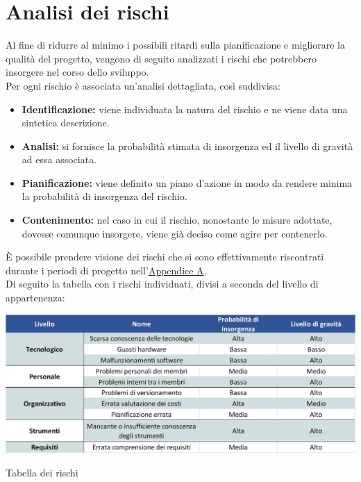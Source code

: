 \newpage

\section{Analisi dei rischi}

Al fine di ridurre al minimo i possibili ritardi sulla pianificazione e migliorare la qualità del progetto, vengono di seguito analizzati i rischi che potrebbero insorgere nel corso dello sviluppo.\\
Per ogni rischio è associata un'analisi dettagliata, così suddivisa:

\begin{itemize}
	\item \textbf{Identificazione:} viene individuata la natura del rischio e ne viene data una sintetica descrizione.
	\item \textbf{Analisi:} si fornisce la probabilità stimata di insorgenza ed il livello di gravità ad essa associata.
	\item \textbf{Pianificazione:} viene definito un piano d'azione in modo da rendere minima la probabilità di insorgenza del rischio. 
	\item \textbf{Contenimento:} nel caso in cui il rischio, nonostante le misure adottate, dovesse comunque insorgere, viene già deciso come agire per contenerlo.
\end{itemize}

È possibile prendere visione dei rischi che si sono effettivamente riscontrati durante i periodi di progetto nell'\hyperref[RiscontroRischi]{Appendice A}.\\
Di seguito la tabella con i rischi individuati, divisi a seconda del livello di appartenenza:

\begin{table}[h!]
	\centerline{\includegraphics[scale=0.50]{img/TabellaRischi.jpg}}
	\caption{Tabella dei rischi}
	\label{fig:tab_risc}
\end{table}


